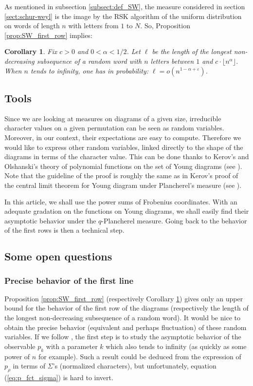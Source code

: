 \documentclass[10pt]{amsart}
\newtheorem{corollary}[theorem]{Corollary}
\theoremstyle{remark}
\begin{document}
As mentioned in subsection \ref{subsect:def_SW}, the measure considered in section \ref{sect:schur-weyl} is the image by the RSK algorithm of the uniform distribution on words of length $n$ with letters from $1$ to $N$. So, Proposition \ref{prop:SW_first_row} implies:
\begin{corollary}\label{th:SW_lis_upbound}
 Fix $c>0$ and $0<\alpha <1/2$. Let $\ell$ be the length of the longest non-decreasing subsequence of a random word with $n$ letters between $1$ and $c \cdot \lfloor n^\alpha \rfloor$. When $n$ tends to infinity, one has in probability: $\ell = o(n^{1-\alpha+\varepsilon})$.
\end{corollary}\bigskip


\subsection{Tools}
Since we are looking at measures on diagrams of a given size, irreducible character values on a given permutation can be seen as random variables. Moreover, in our context, their expectations are easy to compute. Therefore we would like to express other random variables, linked directly to the shape of the diagrams in terms of the character value. This can be done thanks to Kerov's and Olshanski's theory of polynomial functions on the set of Young diagrams (see \cite{KO94}). Note that the guideline of the proof is roughly the same as in Kerov's proof of the central limit theorem for Young diagram under Plancherel's measure (see \cite{IO02}).\bigskip

In this article, we shall use the power sums of Frobenius coordinates. With an adequate gradation on the functions on Young diagrams, we shall easily find their asymptotic behavior under the $q$-Plancherel measure. Going back to the behavior of the first rows is then a technical step.\bigskip



\subsection{Some open questions}
\subsubsection{Precise behavior of the first line}
Proposition \ref{prop:SW_first_row} (respectively Corollary \ref{th:SW_lis_upbound}) gives only an upper bound for the behavior of the first row of the diagrams (respectively the length of the longest non-decreasing subsequence of a random word). It would be nice to obtain the precise behavior (equivalent and perhaps fluctuation) of these random variables. If we follow \cite{Okounkov99}, the first step is to study the asymptotic behavior of the observable $p_k$ with a parameter $k$ which also tends to infinity (as quickly as some power of $n$ for example). Such a result could be deduced from the expression of $p_\rho$ in terms of $\varSigma$'s (normalized characters), but unfortunately, equation (\ref{eq:p_fct_sigma}) is hard to invert.
\end{document}
